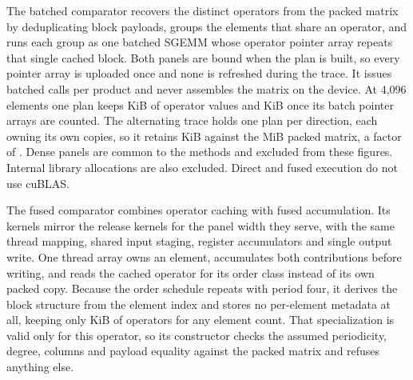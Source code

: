 The batched comparator recovers the distinct operators from the packed matrix
by deduplicating block payloads, groups the elements that share an operator,
and runs each group as one batched SGEMM whose operator pointer array repeats
that single cached block. Both panels are bound when the plan is built, so
every pointer array is uploaded once and none is refreshed during the trace. It
issues \DgLaunches{} batched calls per product and never assembles the matrix
on the device. At 4,096 elements one plan keeps \DgOperatorKiB{} KiB of
operator values and \DgPlanKiB{} KiB once its batch pointer arrays are counted.
The alternating trace holds one plan per direction, each owning its own copies,
so it retains \DgTraceKiB{} KiB against the \DgAssembledMiB{} MiB packed
matrix, a factor of \DgStorageFactor{}. Dense panels are common to the methods and excluded from these figures.
Internal library allocations are also excluded. Direct and fused execution
do not use cuBLAS.

The fused comparator combines operator caching with fused accumulation. Its
kernels mirror the release kernels for the panel width they serve, with the
same thread mapping, shared input staging, register accumulators and single
output write. One thread array owns an element, accumulates both contributions
before writing, and reads the cached operator for its order class instead of
its own packed copy. Because the order schedule repeats with period four, it
derives the block structure from the element index and stores no per-element
metadata at all, keeping only \DgOperatorKiB{} KiB of operators for any element
count. That specialization is valid only for this operator, so its constructor
checks the assumed periodicity, degree, columns and payload equality against
the packed matrix and refuses anything else.

\begin{table}[!htbp]
\centering\small
\caption{Both specialized transport comparators against direct execution on
the same six traces, with the matched control. Batched, Fused and Copies each
divide comparator time by direct time, so values above one favor direct
execution and values below one favor the comparator. Copies is the fused
kernel reading a private operator copy per element. Sharing divides Copies by
Fused, isolating what operator sharing is worth, and its range gives the
smallest and largest of three paired process ratios. Ratios and absolute
times are geometric means across three processes, each using the median of
six timed traces. Times are GPU milliseconds per trace.}
\label{tab:dg}

\end{table}

